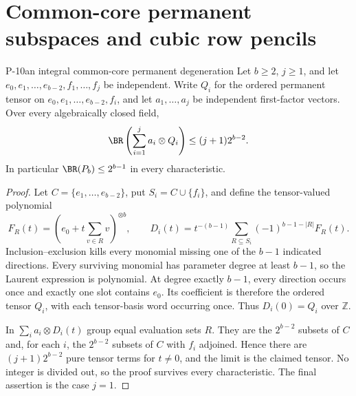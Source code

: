 \section{Common-core permanent subspaces and cubic row pencils}

\begin{finding}{P-10}{an integral common-core permanent degeneration}
Let $b\geq2$, $j\geq1$, and let
$e_0,e_1,\ldots,e_{b-2},f_1,\ldots,f_j$ be independent.
Write $Q_i$ for the ordered permanent tensor on
$e_0,e_1,\ldots,e_{b-2},f_i$, and let $a_1,\ldots,a_j$
be independent first-factor vectors. Over every algebraically
closed field,
\[
 \BR\left(\sum_{i=1}^j a_i\otimes Q_i\right)
 \leq (j+1)2^{b-2}.
\]
In particular $\BR(P_b)\leq2^{b-1}$ in every characteristic.
\end{finding}
\begin{proof}
Let $C=\{e_1,\ldots,e_{b-2}\}$, put $S_i=C\cup\{f_i\}$,
and define the tensor-valued polynomial
\[
 F_R(t)=\left(e_0+t\sum_{v\in R}v\right)^{\otimes b},
 \qquad
 D_i(t)=t^{-(b-1)}\sum_{R\subseteq S_i}
                 (-1)^{b-1-|R|}F_R(t).
\]
Inclusion--exclusion kills every monomial missing one
of the $b-1$ indicated directions. Every surviving
monomial has parameter degree at least $b-1$, so the
Laurent expression is polynomial. At degree exactly
$b-1$, every direction occurs once and exactly one
slot contains $e_0$. Its coefficient is therefore
the ordered tensor $Q_i$, with each tensor-basis word
occurring once. Thus $D_i(0)=Q_i$ over $\mathbb Z$.

In $\sum_i a_i\otimes D_i(t)$ group equal evaluation
sets $R$. They are the $2^{b-2}$ subsets of $C$ and,
for each $i$, the $2^{b-2}$ subsets of $C$ with $f_i$
adjoined. Hence there are $(j+1)2^{b-2}$ pure tensor
terms for $t\ne0$, and the limit is the claimed tensor.
No integer is divided out, so the proof survives every
characteristic. The final assertion is the case $j=1$.
\end{proof}

